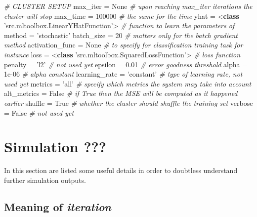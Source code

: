 \documentclass[11pt]{article}
\newenvironment{Shaded}{}{}
\newcommand{\KeywordTok}[1]{\textcolor[rgb]{0.00,0.44,0.13}{\textbf{{#1}}}}
\newcommand{\DecValTok}[1]{\textcolor[rgb]{0.25,0.63,0.44}{{#1}}}
\newcommand{\FloatTok}[1]{\textcolor[rgb]{0.25,0.63,0.44}{{#1}}}
\newcommand{\StringTok}[1]{\textcolor[rgb]{0.25,0.44,0.63}{{#1}}}
\newcommand{\CommentTok}[1]{\textcolor[rgb]{0.38,0.63,0.69}{\textit{{#1}}}}
\newcommand{\NormalTok}[1]{{#1}}
\newcommand{\VariableTok}[1]{\textcolor[rgb]{0.10,0.09,0.49}{{#1}}}
\newcommand{\OperatorTok}[1]{\textcolor[rgb]{0.40,0.40,0.40}{{#1}}}
\begin{document}
\begin{Shaded}
\begin{Highlighting}[]
\CommentTok{# CLUSTER SETUP}
\NormalTok{max_iter }\OperatorTok{=} \VariableTok{None}  \CommentTok{# upon reaching max_iter iterations the cluster will stop}
\NormalTok{max_time }\OperatorTok{=} \DecValTok{100000}  \CommentTok{# the same for the time }
\NormalTok{yhat }\OperatorTok{=} \OperatorTok{<}\KeywordTok{class} \StringTok{'src.mltoolbox.LinearYHatFunction'}\OperatorTok{>}  \CommentTok{# function to learn the parameters of}
\NormalTok{method }\OperatorTok{=} \StringTok{'stochastic'}
\NormalTok{batch_size }\OperatorTok{=} \DecValTok{20}  \CommentTok{# matters only for the batch gradient method}
\NormalTok{activation_func }\OperatorTok{=} \VariableTok{None}  \CommentTok{# to specify for classification training task for instance}
\NormalTok{loss }\OperatorTok{=} \OperatorTok{<}\KeywordTok{class} \StringTok{'src.mltoolbox.SquaredLossFunction'}\OperatorTok{>}  \CommentTok{# loss function}
\NormalTok{penalty }\OperatorTok{=} \StringTok{'l2'}  \CommentTok{# not used yet}
\NormalTok{epsilon }\OperatorTok{=} \FloatTok{0.01}  \CommentTok{# error goodness threshold}
\NormalTok{alpha }\OperatorTok{=} \FloatTok{1e-06}  \CommentTok{# alpha constant}
\NormalTok{learning_rate }\OperatorTok{=} \StringTok{'constant'}  \CommentTok{# type of learning rate, not used yet}
\NormalTok{metrics }\OperatorTok{=} \StringTok{'all'}  \CommentTok{# specify which metrics the system may take into account}
\NormalTok{alt_metrics }\OperatorTok{=} \VariableTok{False}  \CommentTok{# if True then the MSE will be computed as it happened earlier}
\NormalTok{shuffle }\OperatorTok{=} \VariableTok{True}  \CommentTok{# whether the cluster should shuffle the training set}
\NormalTok{verbose }\OperatorTok{=} \VariableTok{False}  \CommentTok{# not used yet}
\end{Highlighting}
\end{Shaded}

    \section{Simulation ???}\label{simulation}

In this section are listed some useful details in order to doubtless
understand further simulation outputs.

\subsection{\texorpdfstring{Meaning of
\emph{iteration}}{Meaning of iteration}}\label{meaning-of-iteration}
\end{document}
